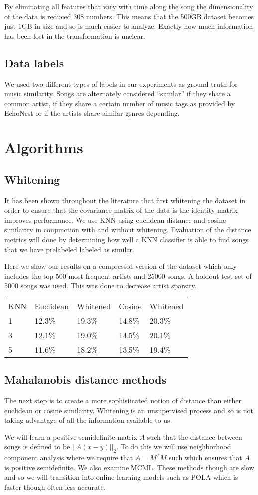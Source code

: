 \documentclass[a4paper,10pt]{article}
\begin{document}
By eliminating all features that vary with time along the song the dimensionality of the data is reduced 308 numbers. This means that the 500GB dataset becomes just 1GB in size and so is much easier to analyze. Exactly how much information has been lost in the transformation is unclear. 
\subsection{Data labels}
We used two different types of labels in our experiments as ground-truth for music similarity. Songs are alternately considered ``similar'' if they share a common artist, if they share a certain number of music tags as provided by EchoNest or if the artists share similar genres depending.
\section{Algorithms}
\subsection{Whitening}
It has been shown throughout the literature that first whitening the dataset in order to ensure that the covariance matrix of the data is the identity matrix improves performance. We use KNN using euclidean distance and cosine similarity in conjunction with and without whitening. Evaluation of the distance metrics will done by determining how well a KNN classifier is able to find songs that we have prelabeled labeled as similar.

Here we show our results on a compressed version of the dataset which only includes the top 500 most frequent artists and 25000 songs. A holdout test set of 5000 songs was used. This was done to decrease artist sparsity.
\begin{center}
\begin{tabular}{lllll}
KNN & Euclidean & Whitened & Cosine & Whitened\\
1 & 12.3\% & 19.3\% & 14.8\% & 20.3\%\\
3 & 12.1\% & 19.0\% & 14.5\% & 20.1\% \\
5 & 11.6\% & 18.2\% & 13.5\% & 19.4\% 
\end{tabular}
\end{center}
\subsection{Mahalanobis distance methods}
The next step is to create a more sophisticated notion of distance than either euclidean or cosine similarity. Whitening is an unsupervised process and so is not taking advantage of all the information available to us. 

We will learn a positive-semidefinite matrix $A$ such that the distance between songs is defined to be $||A(x-y)||_2$. To do this we will use neighborhood component analysis where we require that $A=M^TM$ such which ensures that $A$ is positive semidefinite. We also examine MCML. These methods though are slow and so we will transition into online learning models such as POLA which is faster though often less accurate.
{}
\end{document}
